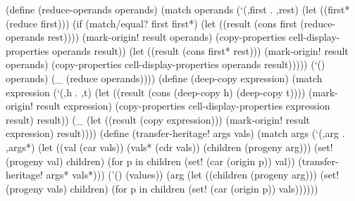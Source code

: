\documentclass[acmsmall]{acmart}
\newenvironment{Snippet}{\Verbatim[samepage=true]}{\endVerbatim}
\begin{document}
\begin{Snippet}
  (define (reduce-operands operands)
    (match operands
\end{Snippet}
\begin{Snippet}
      (`(,first . ,rest)
       (let ((first* (reduce first)))
	 (if (match/equal? first first*)
	     (let ((result (cons first (reduce-operands rest))))
	       (mark-origin! result operands)
	       (copy-properties cell-display-properties operands result))
\end{Snippet}
\begin{Snippet}
	     (let ((result (cons first* rest)))
	       (mark-origin! result operands)
	       (copy-properties cell-display-properties operands result)))))
\end{Snippet}
\begin{Snippet}
      (`()
       operands)
\end{Snippet}
\begin{Snippet}
      (_
       (reduce operands))))
\end{Snippet}
\begin{Snippet}
  (define (deep-copy expression)
    (match expression
\end{Snippet}
\begin{Snippet}
      (`(,h . ,t)
       (let ((result (cons (deep-copy h) (deep-copy t))))
	 (mark-origin! result expression)
	 (copy-properties cell-display-properties expression result)
	 result))
\end{Snippet}
\begin{Snippet}
      (_
       (let ((result (copy expression)))
	 (mark-origin! result expression)
	 result))))
\end{Snippet}
\begin{Snippet}
  (define (transfer-heritage! args vals)
    (match args
\end{Snippet}
\begin{Snippet}
      (`(,arg . ,args*)
       (let ((val (car vals))
	     (vals* (cdr vals))
	     (children (progeny arg)))
	 (set! (progeny val) children)
	 (for p in children
	   (set! (car (origin p)) val))
	 (transfer-heritage! args* vals*)))
\end{Snippet}
\begin{Snippet}
      ('()
       (values))
\end{Snippet}
\begin{Snippet}
      (arg
       (let ((children (progeny arg)))
	 (set! (progeny vals) children)
	 (for p in children
	   (set! (car (origin p)) vals))))))
\end{Snippet}
\end{document}
